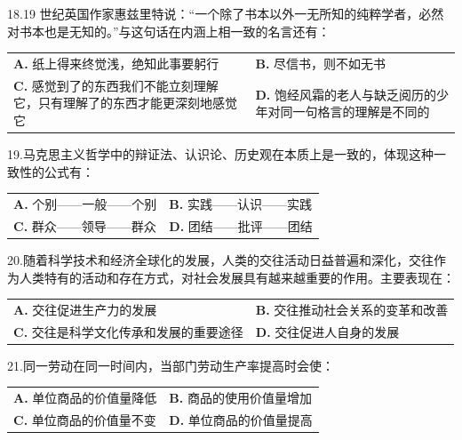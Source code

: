 \documentclass[UTF8,11pt]{ctexart}
\begin{document}
18.19 世纪英国作家惠兹里特说：“一个除了书本以外一无所知的纯粹学者，必然对书本也是无知的。”与这句话在内涵上相一致的名言还有：


\begin{center}\begin{tabular}{>{\raggedright\arraybackslash}p{\dimexpr(\linewidth-4\tabcolsep)/2\relax}>{\raggedright\arraybackslash}p{\dimexpr(\linewidth-4\tabcolsep)/2\relax}}
\textbf{A.} 纸上得来终觉浅，绝知此事要躬行 & \textbf{B.} 尽信书，则不如无书\\[.35em]
\textbf{C.} 感觉到了的东西我们不能立刻理解它，只有理解了的东西才能更深刻地感觉它 & \textbf{D.} 饱经风霜的老人与缺乏阅历的少年对同一句格言的理解是不同的\\[.35em]\end{tabular}\end{center}

19.马克思主义哲学中的辩证法、认识论、历史观在本质上是一致的，体现这种一致性的公式有：


\begin{center}\begin{tabular}{>{\raggedright\arraybackslash}p{\dimexpr(\linewidth-4\tabcolsep)/2\relax}>{\raggedright\arraybackslash}p{\dimexpr(\linewidth-4\tabcolsep)/2\relax}}
\textbf{A.} 个别——一般——个别 & \textbf{B.} 实践——认识——实践\\[.35em]
\textbf{C.} 群众——领导——群众 & \textbf{D.} 团结——批评——团结\\[.35em]\end{tabular}\end{center}

20.随着科学技术和经济全球化的发展，人类的交往活动日益普遍和深化，交往作为人类特有的活动和存在方式，对社会发展具有越来越重要的作用。主要表现在：


\begin{center}\begin{tabular}{>{\raggedright\arraybackslash}p{\dimexpr(\linewidth-4\tabcolsep)/2\relax}>{\raggedright\arraybackslash}p{\dimexpr(\linewidth-4\tabcolsep)/2\relax}}
\textbf{A.} 交往促进生产力的发展 & \textbf{B.} 交往推动社会关系的变革和改善\\[.35em]
\textbf{C.} 交往是科学文化传承和发展的重要途径 & \textbf{D.} 交往促进人自身的发展\\[.35em]\end{tabular}\end{center}

21.同一劳动在同一时间内，当部门劳动生产率提高时会使：


\begin{center}\begin{tabular}{>{\raggedright\arraybackslash}p{\dimexpr(\linewidth-4\tabcolsep)/2\relax}>{\raggedright\arraybackslash}p{\dimexpr(\linewidth-4\tabcolsep)/2\relax}}
\textbf{A.} 单位商品的价值量降低 & \textbf{B.} 商品的使用价值量增加\\[.35em]
\textbf{C.} 单位商品的价值量不变 & \textbf{D.} 单位商品的价值量提高\\[.35em]\end{tabular}\end{center}
\end{document}
